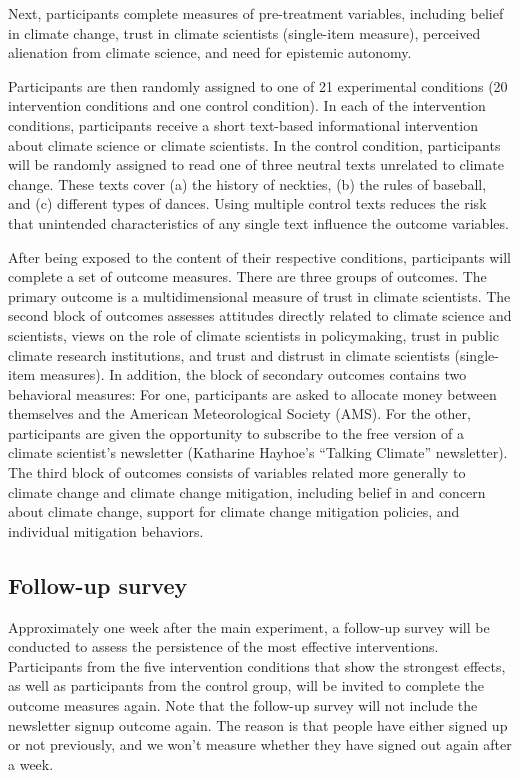 \documentclass[
  letterpaper,
  DIV=11,
  numbers=noendperiod]{scrartcl}
\begin{document}
Next, participants complete measures of pre-treatment variables,
including belief in climate change, trust in climate scientists
(single-item measure), perceived alienation from climate science, and
need for epistemic autonomy.

Participants are then randomly assigned to one of 21 experimental
conditions (20 intervention conditions and one control condition). In
each of the intervention conditions, participants receive a short
text-based informational intervention about climate science or climate
scientists. In the control condition, participants will be randomly
assigned to read one of three neutral texts unrelated to climate change.
These texts cover (a) the history of neckties, (b) the rules of
baseball, and (c) different types of dances. Using multiple control
texts reduces the risk that unintended characteristics of any single
text influence the outcome variables.

After being exposed to the content of their respective conditions,
participants will complete a set of outcome measures. There are three
groups of outcomes. The primary outcome is a multidimensional measure of
trust in climate scientists. The second block of outcomes assesses
attitudes directly related to climate science and scientists, views on
the role of climate scientists in policymaking, trust in public climate
research institutions, and trust and distrust in climate scientists
(single-item measures). In addition, the block of secondary outcomes
contains two behavioral measures: For one, participants are asked to
allocate money between themselves and the American Meteorological
Society (AMS). For the other, participants are given the opportunity to
subscribe to the free version of a climate scientist's newsletter
(Katharine Hayhoe's ``Talking Climate'' newsletter). The third block of
outcomes consists of variables related more generally to climate change
and climate change mitigation, including belief in and concern about
climate change, support for climate change mitigation policies, and
individual mitigation behaviors.

\subsection{Follow-up survey}\label{follow-up-survey}

Approximately one week after the main experiment, a follow-up survey
will be conducted to assess the persistence of the most effective
interventions. Participants from the five intervention conditions that
show the strongest effects, as well as participants from the control
group, will be invited to complete the outcome measures again. Note that
the follow-up survey will not include the newsletter signup outcome
again. The reason is that people have either signed up or not
previously, and we won't measure whether they have signed out again
after a week.
\end{document}
